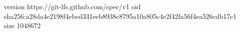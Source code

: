 version https://git-lfs.github.com/spec/v1
oid sha256:a28da4e2198f4ebed331eeb8938c8795a10a805c4e2f42fa56f4ea526cdb17c1
size 1048672
